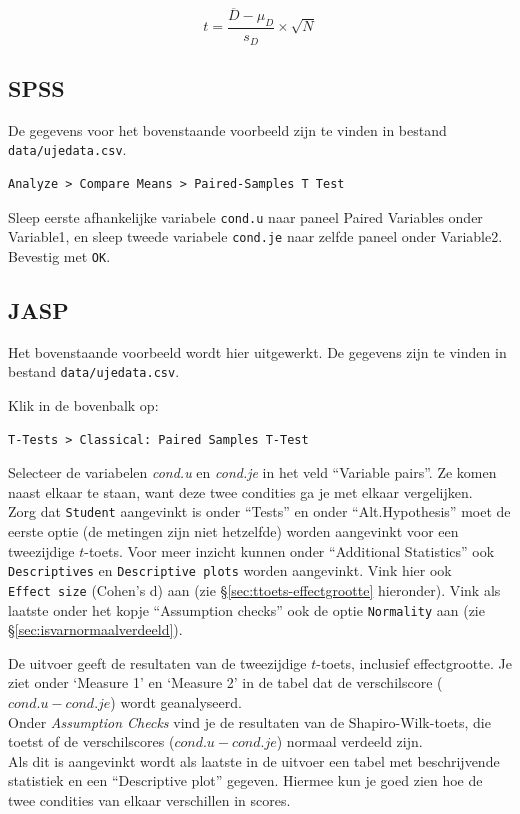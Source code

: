 \documentclass[
]{book}
\begin{document}
\begin{equation}
  \label{eq:t-pairedsamples}
  t = \frac{ \overline{D}-\mu_D} { s_D } \times \sqrt{N}
\end{equation}

\subsection{SPSS}\label{sec:SPSS-ttoets-gepaard}

De gegevens voor het bovenstaande voorbeeld zijn te vinden in bestand
\texttt{data/ujedata.csv}.

\begin{verbatim}
Analyze > Compare Means > Paired-Samples T Test
\end{verbatim}

Sleep eerste afhankelijke variabele \texttt{cond.u} naar paneel Paired
Variables onder Variable1, en sleep tweede variabele \texttt{cond.je} naar
zelfde paneel onder Variable2. Bevestig met \texttt{OK}.

\subsection{JASP}\label{sec:jaspttoetsgepaard}

Het bovenstaande voorbeeld wordt hier uitgewerkt. De gegevens zijn te
vinden in bestand \texttt{data/ujedata.csv}.

Klik in de bovenbalk op:

\begin{verbatim}
T-Tests > Classical: Paired Samples T-Test
\end{verbatim}

Selecteer de variabelen \emph{cond.u} en \emph{cond.je} in het veld ``Variable
pairs''. Ze komen naast elkaar te staan, want deze twee condities ga je
met elkaar vergelijken.\\
Zorg dat \texttt{Student} aangevinkt is onder ``Tests'' en onder ``Alt.Hypothesis''
moet de eerste optie (de metingen zijn niet hetzelfde) worden aangevinkt
voor een tweezijdige \(t\)-toets. Voor meer inzicht kunnen onder
``Additional Statistics'' ook \texttt{Descriptives} en \texttt{Descriptive\ plots} worden
aangevinkt. Vink hier ook \texttt{Effect\ size} (Cohen's d) aan (zie
§\ref{sec:ttoets-effectgrootte} hieronder). Vink als laatste onder het
kopje ``Assumption checks'' ook de optie \texttt{Normality} aan (zie
§\ref{sec:isvarnormaalverdeeld}).

De uitvoer geeft de resultaten van de tweezijdige \(t\)-toets, inclusief
effectgrootte. Je ziet onder `Measure 1' en `Measure 2' in de tabel dat
de verschilscore (\(cond.u - cond.je\)) wordt geanalyseerd.\\
Onder \emph{Assumption Checks} vind je de resultaten van de
Shapiro-Wilk-toets, die toetst of de verschilscores (\(cond.u - cond.je\))
normaal verdeeld zijn.\\
Als dit is aangevinkt wordt als laatste in de uitvoer een tabel met
beschrijvende statistiek en een ``Descriptive plot'' gegeven. Hiermee kun
je goed zien hoe de twee condities van elkaar verschillen in scores.
\end{document}
